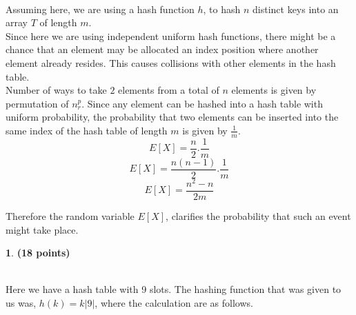 \documentclass[11pt]{article}
\theoremstyle{definition}
\newtheorem{prob}{}
\newcommand{\solution}{\medskip\noindent{\color{DarkBlue}\textbf{Solution:}}}
\begin{document}
\solution \\

Assuming here, we are using a hash function $h$, to hash $n$ distinct keys into an array $T$ of length $m$. \\

Since here we are using independent uniform hash functions, there might be a chance that an element may be allocated an index position
where another element already resides. This causes collisions with other elements in the hash table. \\

Number of ways to take $2$ elements from a total of $n$ elements is given by permutation of $n^p_r$. Since any element can be hashed into a hash table
with uniform probability, the probability that two elements can be inserted into the same index of the hash table of length $m$ is given by $\frac{1}{m}$. \\

\[ E[X] = \frac{n}{2}. \frac{1}{m}\]
\[ E[X] = \frac{n(n-1)}{2}. \frac{1}{m}\]
\[ E[X] = \frac{n^2-n}{2m}\]

Therefore the random variable $E[X]$, clarifies the probability that such an event might take place.

\begin{prob} \textbf{(18 points)}
\end{prob}

\solution \\

Here we have a hash table with 9 slots. The hashing function that was given to us was, $h(k) = k|9|$, where the calculation are as follows. \\
\end{document}
